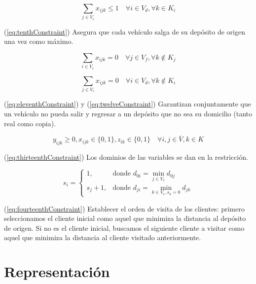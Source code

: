\documentclass[letter, 10pt]{article}
\begin{document}
\begin{equation}
    \label{eq:tenthConstraint}
    \sum_{j \in V_{c}}{x_{ijk}} \leq 1 \quad \forall i \in V_{d}, \forall k \in K_{i}
\end{equation}

(\ref{eq:tenthConstraint}) Asegura que cada vehículo salga de su depósito de origen una vez como máximo.

\begin{equation}
    \label{eq:eleventhConstraint}
    \sum_{i \in V_{c}}{x_{ijk}} = 0 \quad \forall j \in V_{f}, \forall k \notin K_{j}
\end{equation}

\begin{equation}
    \label{eq:twelveConstraint}
    \sum_{j \in V_{c}}{x_{ijk}} = 0 \quad \forall i \in V_{d}, \forall k \notin K_{i}
\end{equation}

(\ref{eq:eleventhConstraint}) y (\ref{eq:twelveConstraint}) Garantizan conjuntamente que un vehículo no pueda salir y regresar a un depósito que no sea su domicilio (tanto real como copia).

\begin{equation}
    \label{eq:thirteenthConstraint}
    y_{ijk} \geq 0, x_{ijk} \in \{0, 1\}, z_{ik} \in \{0, 1\} \quad \forall i, j \in \overline{V}, k \in K
\end{equation}

(\ref{eq:thirteenthConstraint}) Los dominios de las variables se dan en la restricción.

\begin{equation}
    \label{eq:fourteenthConstraint}
    s_{i} = \begin{cases}
            1, & \text{donde } d_{0i} = \min_{j \in V_c} d_{0j} \\
            s_{j} + 1, & \text{donde } d_{ji} = \min_{k \in V_c, s_k = 0} d_{jk}
    \end{cases}
\end{equation}

(\ref{eq:fourteenthConstraint}) Establecer el orden de visita de los clientes: primero seleccionamos el cliente inicial como aquel que minimiza la distancia al depósito de origen. Si no es el cliente inicial, buscamos el siguiente cliente a visitar como aquel que minimiza la distancia al cliente visitado anteriormente.

\section{Representación}
\end{document}
